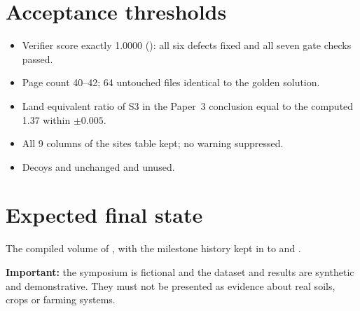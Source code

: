 \documentclass[11pt,a4paper]{article}
\begin{document}
\section*{Acceptance thresholds}
\begin{itemize}
  \item Verifier score exactly 1.0000 (): all six
    defects fixed and all seven gate checks passed.
  \item Page count 40--42; 64 untouched files identical to the golden solution.
  \item Land equivalent ratio of S3 in the Paper~3 conclusion equal to the
    computed 1.37 within $\pm 0.005$.
  \item All 9 columns of the sites table kept; no warning suppressed.
  \item Decoys  and
     unchanged and unused.
\end{itemize}

\section*{Expected final state}
The compiled volume of , with the milestone history
kept in  to
 and .

\medskip
\noindent\textbf{Important:} the symposium is fictional and the dataset and
results are synthetic and demonstrative. They must not be presented as evidence
about real soils, crops or farming systems.
\end{document}
